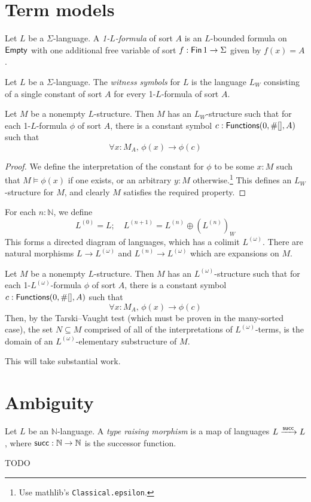 \section{Term models}
\begin{definition}
  Let \( L \) be a \( \Sigma \)-language.
  A \emph{1-\( L \)-formula} of sort \( A \) is an \( L \)-bounded formula on \( \operatorname{\mathsf{Empty}} \) with one additional free variable of sort \( f : \operatorname{\mathsf{Fin}} 1 \to \Sigma \) given by \( f(x) = A \).
\end{definition}
\begin{definition}
  Let \( L \) be a \( \Sigma \)-language.
  The \emph{witness symbols} for \( L \) is the language \( L_W \) consisting of a single constant of sort \( A \) for every 1-\( L \)-formula of sort \( A \).
\end{definition}
\begin{proposition}
  Let \( M \) be a nonempty \( L \)-structure.
  Then \( M \) has an \( L_W \)-structure such that for each 1-\( L \)-formula \( \phi \) of sort \( A \), there is a constant symbol \( c : \operatorname{\mathsf{Functions}}(0, \#[], A) \) such that
  \[ \forall x : M_A,\, \phi(x) \to \phi(c) \]
\end{proposition}
\begin{proof}
  We define the interpretation of the constant for \( \phi \) to be some \( x : M \) such that \( M \vDash \phi(x) \) if one exists, or an arbitrary \( y : M \) otherwise.\footnote{Use mathlib's \texttt{Classical.epsilon}.}
  This defines an \( L_W \)-structure for \( M \), and clearly \( M \) satisfies the required property.
\end{proof}
\begin{definition}
  For each \( n : \mathbb N \), we define
  \[ L^{(0)} = L;\quad L^{(n+1)} = L^{(n)} \oplus (L^{(n)})_W \]
  This forms a directed diagram of languages, which has a colimit \( L^{(\omega)} \).
  There are natural morphisms \( L \to L^{(\omega)} \) and \( L^{(n)} \to L^{(\omega)} \) which are expansions on \( M \).
\end{definition}
\begin{proposition}
  Let \( M \) be a nonempty \( L \)-structure.
  Then \( M \) has an \( L^{(\omega)} \)-structure such that for each 1-\( L^{(\omega)} \)-formula \( \phi \) of sort \( A \), there is a constant symbol \( c : \operatorname{\mathsf{Functions}}(0, \#[], A) \) such that
  \[ \forall x : M_A,\, \phi(x) \to \phi(c) \]
  Then, by the Tarski--Vaught test (which must be proven in the many-sorted case), the set \( N \subseteq M \) comprised of all of the interpretations of \( L^{(\omega)} \)-terms, is the domain of an \( L^{(\omega)} \)-elementary substructure of \( M \).
\end{proposition}
This will take substantial work.

\section{Ambiguity}
\begin{definition}
  Let \( L \) be an \( \mathbb N \)-language.
  A \emph{type raising morphism} is a map of languages \( L \xrightarrow{\operatorname{\mathsf{succ}}} L \), where \( \operatorname{\mathsf{succ}} : \mathbb N \to \mathbb N \) is the successor function.
\end{definition}
TODO
